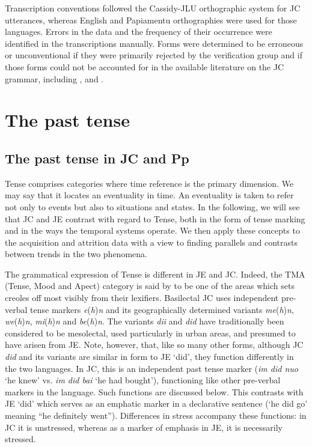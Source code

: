 \documentclass[output=paper,colorlinks,citecolor=brown]{langscibook}
\begin{document}
Transcription conventions followed the Cassidy-JLU orthographic system for JC utterances, whereas English and Papiamentu orthographies were used for those languages. Errors in the data and the frequency of their occurrence were identified in the transcriptions manually. Forms were determined to be erroneous or unconventional if they were primarily rejected by the verification group and if those forms could not be accounted for in the available literature on the JC grammar, including \citet{Bailey1966}, \citet{Patrick2004,Patrick2007} and \citet{winford2003book}.

\section{The past tense} \label{sec:messamk:4}
\subsection{The past tense in JC and Pp} \label{sec:messamk:4.1}
Tense comprises categories where time reference is the primary dimension. We may say that it locates an eventuality in time. An eventuality is taken to refer not only to events but also to situations and states. In the following, we will see that JC and JE contrast with regard to Tense, both in the form of tense marking and in the ways the temporal systems operate. We then apply these concepts to the acquisition and attrition data with a view to finding parallels and contrasts between trends in the two phenomena.


The grammatical expression of Tense is different in JE and JC. Indeed, the TMA (Tense, Mood and Apect) category is said by \citet[12]{Hackert2004} to be one of the areas which sets creoles off most visibly from their lexifiers. Basilectal JC uses independent pre-verbal tense markers \textit{e}(\textit{h})\textit{n} and its geographically determined variants \textit{me}(\textit{h})\textit{n}, \textit{we}(\textit{h})\textit{n}, \textit{mi}(\textit{h})\textit{n} and \textit{be}(\textit{h})\textit{n}. The variants \textit{dii} and \textit{did} have traditionally been considered to be mesolectal, used particularly in urban areas, and presumed to have arisen from JE. Note, however, that, like so many other forms, although JC \textit{did} and its variants are similar in form to JE ‘did’, they function differently in the two languages. In JC, this is an independent past tense marker (\textit{im did nuo} ‘he knew’ vs. \textit{im did bai} ‘he had bought’), functioning like other pre-verbal markers in the language. Such functions are discussed below. This contrasts with JE ‘did’ which serves as an emphatic marker in a declarative sentence (‘he did go’ meaning “he definitely went”). Differences in stress accompany these functions: in JC it is unstressed, whereas as a marker of emphasis in JE, it is necessarily stressed.
\end{document}
